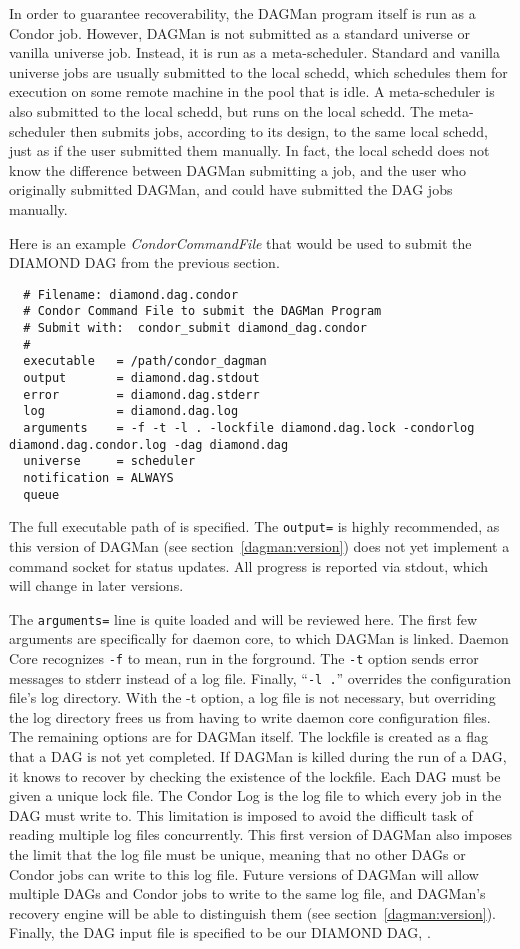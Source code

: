 In order to guarantee recoverability, the DAGMan program itself is run as a
Condor job.  However, DAGMan is not submitted as a standard universe or
vanilla universe job.  Instead, it is run as a meta-scheduler.  Standard and
vanilla universe jobs are usually submitted to the local schedd, which
schedules them for execution on some remote machine in the pool that is idle.
A meta-scheduler is also submitted to the local schedd, but runs on the local
schedd.  The meta-scheduler then submits jobs, according to its design, to the
same local schedd, just as if the user submitted them manually.  In fact, the
local schedd does not know the difference between DAGMan submitting a job, and
the user who originally submitted DAGMan, and could have submitted the DAG
jobs manually.

Here is an example \textit{CondorCommandFile} that would be used to submit the
DIAMOND DAG from the previous section.

\begin{verbatim}
  # Filename: diamond.dag.condor
  # Condor Command File to submit the DAGMan Program
  # Submit with:  condor_submit diamond_dag.condor
  #
  executable   = /path/condor_dagman
  output       = diamond.dag.stdout
  error        = diamond.dag.stderr
  log          = diamond.dag.log
  arguments    = -f -t -l . -lockfile diamond.dag.lock -condorlog diamond.dag.condor.log -dag diamond.dag
  universe     = scheduler
  notification = ALWAYS
  queue
\end{verbatim}

The full executable path of  is specified.  The
\texttt{output=} is highly recommended, as this version of DAGMan (see
section~\ref{dagman:version}) does not yet implement a command socket for
status updates.  All progress is reported via stdout, which will change in
later versions.

The \texttt{arguments=} line is quite loaded and will be reviewed here.  The
first few arguments are specifically for daemon core, to which DAGMan is
linked.  Daemon Core recognizes \texttt{-f} to mean, run in the forground.
The \texttt{-t} option sends error messages to stderr instead of a log file.
Finally, ``\texttt{-l .}'' overrides the configuration file's log directory.
With the -t option, a log file is not necessary, but overriding the log
directory frees us from having to write daemon core configuration files.  The
remaining options are for DAGMan itself.  The lockfile is created as a flag
that a DAG is not yet completed.  If DAGMan is killed during the run of a DAG,
it knows to recover by checking the existence of the lockfile.  Each DAG must
be given a unique lock file.  The Condor Log is the log file to which every
job in the DAG must write to.  This limitation is imposed to avoid the
difficult task of reading multiple log files concurrently.  This first version
of DAGMan also imposes the limit that the log file must be unique, meaning
that no other DAGs or Condor jobs can write to this log file.  Future versions
of DAGMan will allow multiple DAGs and Condor jobs to write to the same log
file, and DAGMan's recovery engine will be able to distinguish them (see
section~\ref{dagman:version}).  Finally, the DAG input file is specified to be
our DIAMOND DAG, .

